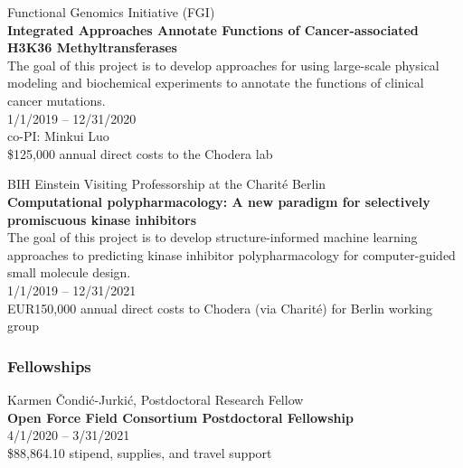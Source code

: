 \documentclass[10pt]{article}
\begin{document}
Functional Genomics Initiative (FGI)  \\
{\bf Integrated Approaches Annotate Functions of Cancer-associated H3K36 Methyltransferases} \\
The goal of this project is to develop approaches for using large-scale physical modeling and biochemical experiments to annotate the functions of clinical cancer mutations.\\
1/1/2019 -- 12/31/2020 \\
co-PI: Minkui Luo \\
\$125,000 annual direct costs to the Chodera lab

\vspace{1.5ex}

BIH Einstein Visiting Professorship at the Charit\'{e} Berlin\\
{\bf Computational polypharmacology: A new paradigm for selectively promiscuous kinase inhibitors}\\
The goal of this project is to develop structure-informed machine learning approaches to predicting kinase inhibitor polypharmacology for computer-guided small molecule design.\\
1/1/2019 -- 12/31/2021\\
EUR150,000 annual direct costs to Chodera (via Charit\'{e}) for Berlin working group

%


\vspace{-0.1in} 

\subsubsection*{Fellowships}

Karmen \v{C}ondi\'{c}-Jurki\'{c}, Postdoctoral Research Fellow\\
{\bf Open Force Field Consortium Postdoctoral Fellowship}\\
4/1/2020 -- 3/31/2021\\
\$88,864.10 stipend, supplies, and travel support
\end{document}
